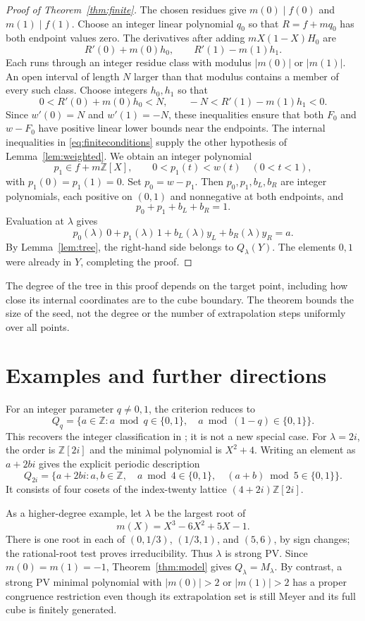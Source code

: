 \documentclass[11pt]{article}
\theoremstyle{remark}
\newcommand{\Z}{\mathbb Z}
\begin{document}
\begin{proof}[Proof of Theorem~\ref{thm:finite}]
The chosen residues give $m(0)\mid f(0)$ and $m(1)\mid f(1)$. Choose an integer linear polynomial $q_0$ so that $R=f+mq_0$ has both endpoint values zero. The derivatives after adding $mX(1-X)H_0$ are
\[
 R'(0)+m(0)h_0,\qquad R'(1)-m(1)h_1.
\]
Each runs through an integer residue class with modulus $|m(0)|$ or $|m(1)|$. An open interval of length $N$ larger than that modulus contains a member of every such class. Choose integers $h_0,h_1$ so that
\[
 0<R'(0)+m(0)h_0<N,\qquad
 -N<R'(1)-m(1)h_1<0.
\]
Since $w'(0)=N$ and $w'(1)=-N$, these inequalities ensure that both $F_0$ and $w-F_0$ have positive linear lower bounds near the endpoints. The internal inequalities in \eqref{eq:finiteconditions} supply the other hypothesis of Lemma~\ref{lem:weighted}. We obtain an integer polynomial
\[
 p_1\in f+m\Z[X],\qquad 0<p_1(t)<w(t)\quad(0<t<1),
\]
with $p_1(0)=p_1(1)=0$. Set $p_0=w-p_1$. Then $p_0,p_1,b_L,b_R$ are integer polynomials, each positive on $(0,1)$ and nonnegative at both endpoints, and
\[
 p_0+p_1+b_L+b_R=1.
\]
Evaluation at $\lambda$ gives
\[
 p_0(\lambda)\,0+p_1(\lambda)\,1+b_L(\lambda)y_L+b_R(\lambda)y_R=a.
\]
By Lemma~\ref{lem:tree}, the right-hand side belongs to $Q_\lambda(Y)$. The elements $0,1$ were already in $Y$, completing the proof.
\end{proof}

The degree of the tree in this proof depends on the target point, including how close its internal coordinates are to the cube boundary. The theorem bounds the size of the seed, not the degree or the number of extrapolation steps uniformly over all points.

\section{Examples and further directions}
For an integer parameter $q\ne0,1$, the criterion reduces to
\[
 Q_q=\{a\in\Z:a\bmod q\in\{0,1\},\quad
 a\bmod(1-q)\in\{0,1\}\}.
\]
This recovers the integer classification in \cite{FGH2020}; it is not a new special case. For $\lambda=2i$, the order is $\Z[2i]$ and the minimal polynomial is $X^2+4$. Writing an element as $a+2bi$ gives the explicit periodic description
\[
 Q_{2i}=\{a+2bi:a,b\in\Z,\quad
 a\bmod4\in\{0,1\},\quad(a+b)\bmod5\in\{0,1\}\}.
\]
It consists of four cosets of the index-twenty lattice $(4+2i)\Z[2i]$.

As a higher-degree example, let $\lambda$ be the largest root of
\[
 m(X)=X^3-6X^2+5X-1.
\]
There is one root in each of $(0,1/3)$, $(1/3,1)$, and $(5,6)$, by sign changes; the rational-root test proves irreducibility. Thus $\lambda$ is strong PV. Since $m(0)=m(1)=-1$, Theorem~\ref{thm:model} gives $Q_\lambda=M_\lambda$. By contrast, a strong PV minimal polynomial with $|m(0)|>2$ or $|m(1)|>2$ has a proper congruence restriction even though its extrapolation set is still Meyer and its full cube is finitely generated.
\end{document}
